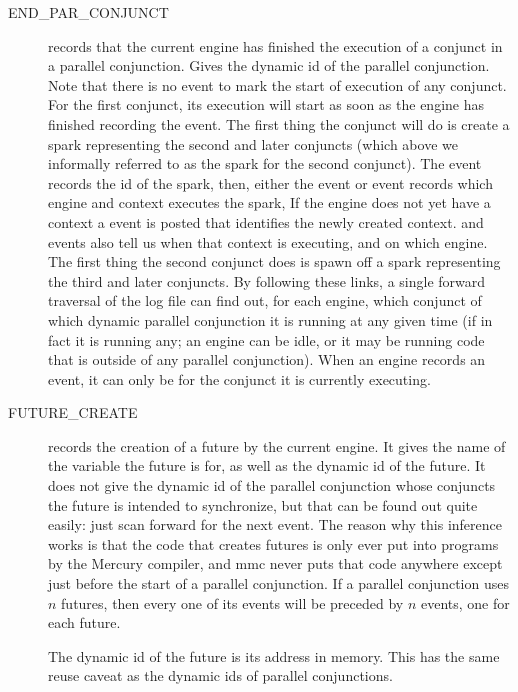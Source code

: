 \begin{description}
\item[END\_PAR\_CONJUNCT]
records that the current engine
has finished the execution of a conjunct in a parallel conjunction.
Gives the dynamic id of the parallel conjunction.
Note that there is no  event
to mark the start of execution of any conjunct.
For the first conjunct, its execution will start
as soon as the engine has finished recording the
 event.
The first thing the conjunct will do is create a spark
representing the second and later conjuncts
(which above we informally referred to as the spark for the second conjunct).
The  event records the id of the spark,
then, either the  event or  event records
which engine and context executes the spark,
If the engine does not yet have a context a 
event is posted that identifies the newly created context.
 and  events
also tell us when that context is executing, and on which engine.
The first thing the second conjunct does is spawn off a spark
representing the third and later conjuncts.
By following these links,
a single forward traversal of the log file can find out,
for each engine, which conjunct of which dynamic parallel conjunction
it is running at any given time
(if in fact it is running any;
an engine can be idle,
or it may be running code that is outside of any parallel conjunction).
When an engine records an  event,
it can only be for the conjunct it is currently executing.

\item[FUTURE\_CREATE] records the creation of a future by the current
engine.
It gives the name of the variable the future is for,
as well as the dynamic id of the future.
It does not give the dynamic id of the parallel conjunction
whose conjuncts the future is intended to synchronize,
but that can be found out quite easily:
just scan forward for the next 
event.
The reason why this inference works is that
the code that creates futures
is only ever put into programs by the Mercury compiler,
and mmc never puts that code anywhere
except just before the start of a parallel conjunction.
If a parallel conjunction uses $n$ futures,
then every one of its  events
will be preceded by $n$  events,
one for each future.

The dynamic id of the future is its address in memory.
This has the same reuse caveat
as the dynamic ids of parallel conjunctions.


\end{description}
